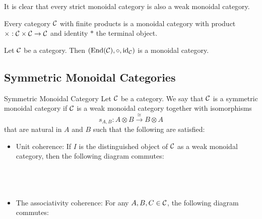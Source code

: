 \documentclass[a4paper]{article}
\begin{document}
It is clear that every strict monoidal category is also a weak monoidal category. 

\begin{lmm}{}{} Every category $\mathcal{C}$ with finite products is a monoidal category with product $\times:\mathcal{C}\times\mathcal{C}\to\mathcal{C}$ and identity $\ast$ the terminal object. 
\end{lmm}

\begin{prp}{}{} Let $\mathcal{C}$ be a category. Then $(\text{End}(\mathcal{C}),\circ,\text{id}_{\mathcal{C}})$ is a monoidal category. 
\end{prp}

\subsection{Symmetric Monoidal Categories}
\begin{defn}{Symmetric Monoidal Category}{} Let $\mathcal{C}$ be a category. We say that $\mathcal{C}$ is a symmetric monoidal category if $\mathcal{C}$ is a weak monoidal category together with isomorphisms $$s_{A,B}:A\otimes B\overset{\cong}{\longrightarrow} B\otimes A$$ that are natural in $A$ and $B$ such that the following are satisfied: 
\begin{itemize}
\item Unit coherence: If $I$ is the distinguished object of $\mathcal{C}$ as a weak monoidal category, then the following diagram commutes: \\~\\
\\~\\
\item The associativity coherence: For any $A,B,C\in\mathcal{C}$, the following diagram commutes: \\~\\
\end{itemize}
\end{defn}
\end{document}
